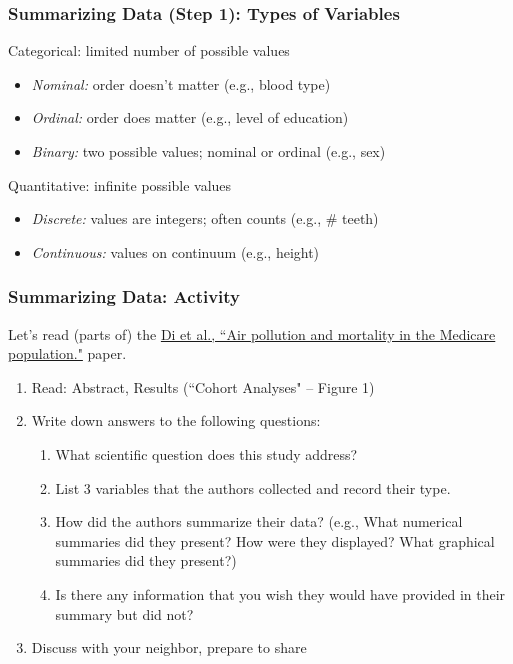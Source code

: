 \documentclass[12pt, 
hyperref={colorlinks=true, linkcolor=blue, urlcolor=cyan}]{beamer}
\begin{document}
\begin{frame}
\frametitle{Summarizing Data (Step 1): Types of Variables}

\color{blue} Categorical: \color{black} limited number of possible values
\begin{itemize}
\item \textit{Nominal:} order doesn't matter (e.g., blood type)
\item \textit{Ordinal:} order does matter (e.g., level of education)
\item \textit{Binary:} two possible values; nominal or ordinal (e.g., sex)
\end{itemize}

\color{blue} Quantitative: \color{black} infinite possible values
\begin{itemize}
\item \textit{Discrete:} values are integers; often counts (e.g., \#  teeth)
\item \textit{Continuous:} values on continuum (e.g., height)
\end{itemize}
\end{frame}


\begin{frame}
\frametitle{Summarizing Data: Activity}

Let's read (parts of) the \href{http://www.nejm.org/doi/10.1056/NEJMoa1702747}{Di et al., ``Air pollution and mortality in the Medicare population."} paper. \vspace{-0.2cm}

\begin{enumerate}
\item Read: Abstract, Results (``Cohort Analyses" -- Figure 1)
\item Write down answers to the following questions:
	\begin{enumerate}
	\item What scientific question does this study address?
	\item List 3 variables that the authors collected and record their type.
	\item How did the authors summarize their data? (e.g., What numerical summaries did they present? How were they displayed? What graphical summaries did they present?)
	\item Is there any information that you wish they would have provided in their summary but did not?
	\end{enumerate}
\item Discuss with your neighbor, prepare to share
\end{enumerate}
\end{frame}
\end{document}
